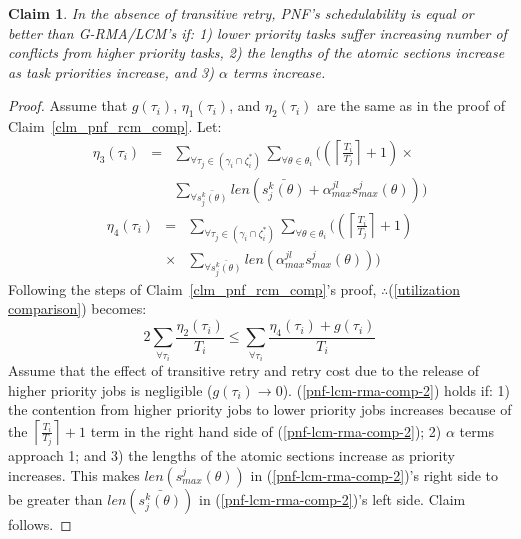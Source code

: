 \documentclass[a4paper,english]{article}
\newtheorem{clm}{Claim}
\newtheorem{proof}{Proof}
\begin{document}
\begin{clm}\label{sub:pnf_lcm_rma_comp}
%
In the absence of transitive retry, PNF's schedulability is equal or better than G-RMA/LCM's if: 1) lower priority tasks suffer increasing number of conflicts from higher priority tasks, 2) the lengths of the atomic sections increase as task priorities increase, and 3) $\alpha$ terms increase.
%
\end{clm}
\begin{proof}\normalfont
Assume that $g(\tau_{i})$, $\eta_{1}(\tau_{i})$, and $\eta_{2}(\tau_{i})$ are the same as in the proof of Claim~\ref{clm_pnf_rcm_comp}. Let:
\begin{eqnarray*}
\eta_{3}(\tau_{i}) & = & \sum_{\forall\tau_{j}\in(\gamma_{i}\cap\zeta_{i}^{*})}\sum_{\forall\theta\in\theta_{i}}\Bigg(\left(\left\lceil \frac{T_{i}}{T_{j}}\right\rceil +1\right)\times\\
 &  & \sum_{\forall\bar{s_{j}^{k}(\theta)}}len\left(\bar{s_{j}^{k}(\theta)}+\alpha_{max}^{jl}s_{max}^{j}(\theta)\right)\Bigg)
\end{eqnarray*}
\begin{eqnarray*}
\eta_{4}(\tau_{i}) & = & \sum_{\forall\tau_{j}\in(\gamma_{i}\cap\zeta_{i}^{*})}\sum_{\forall\theta\in\theta_{i}}\Bigg(\left(\left\lceil \frac{T_{i}}{T_{j}}\right\rceil +1\right)\\
 & \times & \sum_{\forall\bar{s_{j}^{k}(\theta)}}len\left(\alpha_{max}^{jl}s_{max}^{j}(\theta)\right)\Bigg)
\end{eqnarray*}
Following the steps of Claim~\ref{clm_pnf_rcm_comp}'s proof, 
$\therefore$(\ref{utilization comparison}) becomes:
\begin{equation}
2\sum_{\forall\tau_{i}}\frac{\eta_{2}(\tau_{i})}{T_{i}}\le\sum_{\forall\tau_{i}}\frac{\eta_{4}(\tau_{i})+g(\tau_{i})}{T_{i}}\label{pnf-lcm-rma-comp-2}
\end{equation}
Assume that the effect of transitive retry and retry cost due
to the release of higher priority jobs is negligible ($g(\tau_{i})\rightarrow0$). (\ref{pnf-lcm-rma-comp-2})
holds if: 1) the contention from higher priority jobs to lower priority
jobs increases because of the $\left\lceil \frac{T_{i}}{T_{j}}\right\rceil +1$
term in the right hand side of (\ref{pnf-lcm-rma-comp-2}); 2) $\alpha$ terms
approach 1; and 3) the lengths of the atomic sections increase as priority
increases. 
%
This makes $len(s_{max}^{j}(\theta))$ in (\ref{pnf-lcm-rma-comp-2})'s right 
side to be greater than $len(\bar{s_{j}^{k}(\theta)})$ in (\ref{pnf-lcm-rma-comp-2})'s left  side.
Claim follows.
\end{proof}
\end{document}
